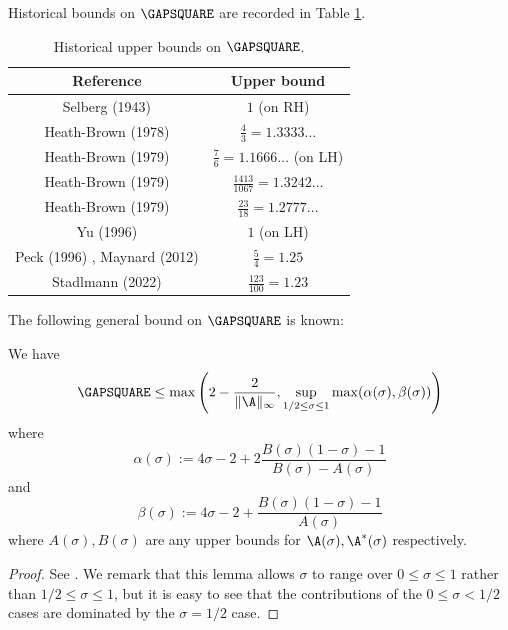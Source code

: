     Historical bounds on $\GAPSQUARE$ are recorded in Table \ref{gapsquare-table}.

    \begin{table}[ht]
        \caption{Historical upper bounds on $\GAPSQUARE$.}
        \label{gapsquare-table}
        \centering
        \renewcommand{\arraystretch}{1.2}
        \begin{tabular}{|c|c|}
        \hline
        Reference & Upper bound \\
        \hline
        Selberg (1943) \cite{selberg_1943} & $1$ (on RH)\\
        \hline
        Heath-Brown (1978) \cite{heath_brown_consecutive_I} & $\frac{4}{3} = 1.3333\dots$\\
        \hline
        Heath-Brown (1979) \cite{heath_brown_consecutive_II} & $\frac{7}{6} = 1.1666\dots$ (on LH) \\
        \hline
        Heath-Brown (1979) \cite{heath_brown_consecutive_II} & $\frac{1413}{1067} = 1.3242\dots$ \\
        \hline
        Heath-Brown (1979) \cite{heath_brown_consecutive_III} & $\frac{23}{18} = 1.2777\dots$ \\
        \hline
        Yu (1996) \cite{yu_differences_1996} & $1$ (on LH) \\
        \hline
        Peck (1996) \cite{peck_on_1996}, Maynard (2012) \cite{maynard_difference_2012} & $\frac{5}{4} = 1.25$ \\
        \hline
        Stadlmann (2022) \cite{stadlmann_mean_2022} & $\frac{123}{100} = 1.23$ \\
        \hline
    \end{tabular}
    \end{table}

The following general bound on $\GAPSQUARE$ is known:

\begin{proposition}\label{gapsquare-from-a}
    We have
    $$ \GAPSQUARE \leq \max\left( 2-\frac{2}{\|\A\|_\infty}, \sup_{1/2 \leq \sigma \leq 1} \max(\alpha(\sigma), \beta(\sigma))\right)$$
    where
    $$ \alpha(\sigma) := 4\sigma - 2 + 2 \frac{B(\sigma)(1-\sigma)-1}{B(\sigma)-A(\sigma)}$$
    and
    $$ \beta(\sigma) := 4\sigma - 2 + \frac{B(\sigma)(1-\sigma)-1}{A(\sigma)}$$
    where $A(\sigma), B(\sigma)$ are any upper bounds for $\A(\sigma), \A^*(\sigma)$ respectively.
\end{proposition}

\begin{proof} See \cite[Lemma 2]{heath_brown_consecutive_II}. We remark that this lemma allows $\sigma$ to range over $0 \leq \sigma \leq 1$ rather than $1/2 \leq \sigma \leq 1$, but it is easy to see that the contributions of the $0 \leq \sigma < 1/2$ cases are dominated by the $\sigma=1/2$ case.
\end{proof}

